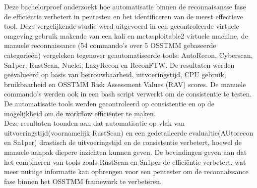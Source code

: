 Deze bachelorproef onderzoekt hoe automatisatie binnen de reconnaisansse fase de efficiëntie verbetert in pentesten en het identificeren van de meest effectieve tool.
Deze vergelijkende studie werd uitgevoerd in een gecontroleerde virtuele omgeving gebruik makende van een kali en metasploitable2 virtuele machine, de manuele reconnaissance (54 commando's over 5 OSSTMM gebaseerde categorieën) vergeleken tegenover geautomatiseerde tools: AutoRecon, Cyberscan, Sn1per, RustScan, Nuclei, LazyRecon en ReconFTW.
De resultaten werden geëvalueerd op basis van betrouwbaarheid, uitvoeringstijd, CPU gebruik, bruikbaarheid en OSSTMM Risk Assessment Values (RAV) scores.
De manuele commando's werden ook in een bash script verwerkt om de consistentie te testen. De automatisatie tools werden gecontroleerd op consistentie en op de mogelijkheid om de workflow efficiënter te maken.\\


Deze resultaten toonden aan dat automatisatie op vlak van uitvoeringstijd(voornamelijk RustScan) en een gedetaileerde evalualtie(AUtorecon en Sn1per)
drastisch de uitvoeringstijd en de consistentie verbetert, hoewel de manuele aanpak diepere inzichten kunnen geven.
De bevindingen geven aan dat het combineren van tools zoals RustScan en Sn1per de efficiëntie verbetert, wat meer nuttige informatie kan opbrengen voor een pentester om de reconnaissance fase binnen het OSSTMM framework te verbeteren.
